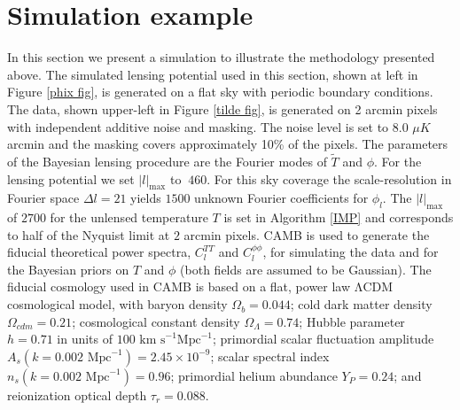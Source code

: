 \documentclass[iop,revtex4,apj,onecolumn]{emulateapj}
\begin{document}
%
%
\section{Simulation example}
\label{Section: simulation examples}

In this section we present a simulation to illustrate the methodology presented above. The simulated lensing potential used in this section, shown at left in Figure \ref{phix fig}, is generated on a flat sky with periodic boundary conditions. The data, shown upper-left in Figure \ref{tilde fig}, is generated on 2 arcmin pixels with independent additive noise and masking. The noise level is set to $8.0$ $\mu K$ arcmin and the masking covers approximately 10\% of the pixels.  The parameters of the Bayesian lensing procedure are the Fourier modes of $\widetilde T$ and $\phi$. For the lensing potential we set $|l|_\text{max}$ to $~460$. 
For this sky coverage the scale-resolution in Fourier space  $\Delta l = 21$ yields $1500$ unknown Fourier coefficients for $\phi_l$. The $|l|_\text{max}$ of $2700$ for the unlensed temperature $T$ is set in Algorithm \ref{IMP} and corresponds to half of the Nyquist limit at $2$ arcmin pixels. 
CAMB \citep{Lewis:1999bs} is used to generate the fiducial theoretical power spectra, $C_l^{TT}$ and $C_l^{\phi\phi}$, for simulating the data and for the Bayesian priors on $T$ and $\phi$ (both fields are assumed to be Gaussian).
The fiducial cosmology used  in CAMB is based on a flat, power law ΛCDM cosmological model, with baryon density $\Omega_b = 0.044$; cold dark matter density $\Omega_{cdm} = 0.21$; cosmological constant density $\Omega_\Lambda = 0.74$; Hubble parameter $h = 0.71$ in units of $100 \text{ km s}^{-1} \text{Mpc}^{-1}$; primordial scalar fluctuation amplitude $A_s(k = 0.002 \text{ Mpc}^{-1}) = 2.45 \times 10^{-9}$; scalar spectral index $n_s(k = 0.002\text{ Mpc}^{-1}) = 0.96$; primordial helium
abundance $Y_P = 0.24$; and reionization optical depth $\tau_r = 0.088$. 
\end{document}
